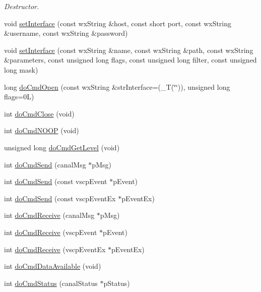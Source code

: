 \begin{DoxyCompactItemize}
\begin{DoxyCompactList}\small\item\em Destructor. \end{DoxyCompactList}\item 
void \hyperlink{class_c_canal_super_wrapper_a5c4800e754bd287ac286d3bef7060ffd}{setInterface} (const wxString \&host, const short port, const wxString \&username, const wxString \&password)
\item 
void \hyperlink{class_c_canal_super_wrapper_ae4fabb9b3cb33e5d950357f7dbab1a73}{setInterface} (const wxString \&name, const wxString \&path, const wxString \&parameters, const unsigned long flags, const unsigned long filter, const unsigned long mask)
\item 
long \hyperlink{class_c_canal_super_wrapper_a35b4f3182ff337cb59e4de5ff8f86b8c}{doCmdOpen} (const wxString \&strInterface=(\_\-T(\char`\"{}\char`\"{})), unsigned long flags=0L)
\item 
int \hyperlink{class_c_canal_super_wrapper_a8508e6c901500c0a96dffd627a58127f}{doCmdClose} (void)
\item 
int \hyperlink{class_c_canal_super_wrapper_a602c55791afdc8db3598d06a858bd07d}{doCmdNOOP} (void)
\item 
unsigned long \hyperlink{class_c_canal_super_wrapper_a8273a1037a6ede0a2e7ea71cd0b1d30f}{doCmdGetLevel} (void)
\item 
int \hyperlink{class_c_canal_super_wrapper_a2fcdc5f6fdb9089dfb34a94914eb513c}{doCmdSend} (canalMsg $\ast$pMsg)
\item 
int \hyperlink{class_c_canal_super_wrapper_a01be8e33fc4b6ec9ff0cc192e116b70d}{doCmdSend} (const vscpEvent $\ast$pEvent)
\item 
int \hyperlink{class_c_canal_super_wrapper_a1e7eeba2b6c9063db4adab2221b90d94}{doCmdSend} (const vscpEventEx $\ast$pEventEx)
\item 
int \hyperlink{class_c_canal_super_wrapper_ab9ecc6001b864f751ac4cdce8f02bf08}{doCmdReceive} (canalMsg $\ast$pMsg)
\item 
int \hyperlink{class_c_canal_super_wrapper_a9041d94956f75f19f9889bd78809a930}{doCmdReceive} (vscpEvent $\ast$pEvent)
\item 
int \hyperlink{class_c_canal_super_wrapper_a010bce95ad7e230aafdc4fcc73b90478}{doCmdReceive} (vscpEventEx $\ast$pEventEx)
\item 
int \hyperlink{class_c_canal_super_wrapper_ae68f837b448c3b2b2d906a476952033e}{doCmdDataAvailable} (void)
\item 
int \hyperlink{class_c_canal_super_wrapper_afc54763410f122eb1a57f593325449aa}{doCmdStatus} (canalStatus $\ast$pStatus)

\end{DoxyCompactItemize}
